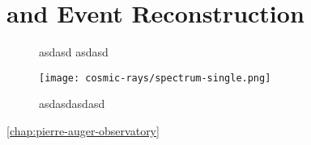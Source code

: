 \section{\Offline and Event Reconstruction}
\label{sec:rec}

\begin{figure}[t]
  \centering
  \hspace{0.2cm}
  \caption[]{ asdasd  asdasd}
  \label{fig:}
\end{figure}

\begin{figure}[t]
  \centering
  \texttt{[image: cosmic-rays/spectrum-single.png]}
  \caption{asdasdasdasd}
  \label{fig:asdasd}
\end{figure}

\cref{chap:pierre-auger-observatory} 
